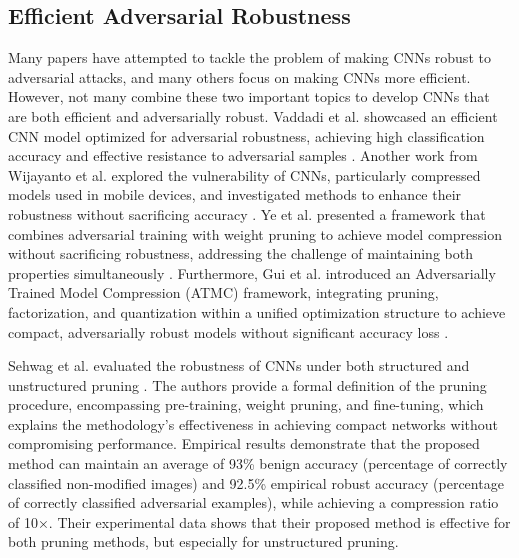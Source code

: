 \documentclass[journal,onecolumn,12pt]{IEEEtran}
\begin{document}

\subsection{Efficient Adversarial Robustness}
Many papers have attempted to tackle the problem of making CNNs robust to adversarial attacks, and many others focus on making CNNs more efficient. However, not many combine these two important topics to develop CNNs that are both efficient and adversarially robust. Vaddadi et al. showcased an efficient CNN model optimized for adversarial robustness, achieving high classification accuracy and effective resistance to adversarial samples \cite{EAR1}. Another work from Wijayanto et al. explored the vulnerability of CNNs, particularly compressed models used in mobile devices, and investigated methods to enhance their robustness without sacrificing accuracy \cite{EAR2}. Ye et al. presented a framework that combines adversarial training with weight pruning to achieve model compression without sacrificing robustness, addressing the challenge of maintaining both properties simultaneously \cite{EAR3}. Furthermore, Gui et al. introduced an Adversarially Trained Model Compression (ATMC) framework, integrating pruning, factorization, and quantization within a unified optimization structure to achieve compact, adversarially robust models without significant accuracy loss \cite{EAR4}. 

Sehwag et al. evaluated the robustness of CNNs under both structured and unstructured pruning \cite{beforehydra}. The authors provide a formal definition of the pruning procedure, encompassing pre-training, weight pruning, and fine-tuning, which explains the methodology's effectiveness in achieving compact networks without compromising performance. Empirical results demonstrate that the proposed method can maintain an average of 93\% benign accuracy (percentage of correctly classified non-modified images) and 92.5\% empirical robust accuracy (percentage of correctly classified adversarial examples), while achieving a compression ratio of 10×. Their experimental data shows that their proposed method is effective for both pruning methods, but especially for unstructured pruning.
\end{document}
